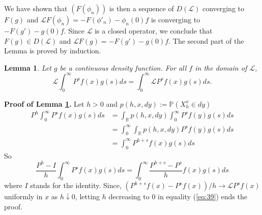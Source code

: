 \documentclass[a4paper, 11pt]{article}
\newtheorem{lem}{Lemma}
\renewcommand{\P}{\mathbb{P}}
\newcommand{\R}{\mathbb{R}}
\newcommand{\1}{\mathbf{1}}
\begin{document}
\noindent We have shown that $(F(\phi_n))$ is then a sequence of $D(\mathcal{L})$ converging to $F(g)$ and $\mathcal{L}F(\phi_n)=-F(\phi'_n)-\phi_n(0)f$ is converging to $-F(g')-g(0)f$. Since $\mathcal{L}$ is a closed operator, we conclude that $F(g)\in D(\mathcal{L})$ and $\mathcal{L}F(g)=-F(g')-g(0)f$.
The second part of the Lemma is proved by induction. \hfill \framebox[0.6em]

\begin{lem}\label{intervertion}
Let $g$ be a continuous density function. For all $f$ in the domain of $\mathcal{L}$,
$$\mathcal{L}\int_0^\infty P^sf(x)g(s)ds=\int_0^\infty \mathcal{L}P^sf(x)g(s)ds.$$
\end{lem}

\noindent\textbf{Proof of Lemma \ref{intervertion}.}
Let $h>0$ and $p(h,x,dy):=\P(X_h^x \in dy)$
\begin{align*}
P^h\int_0^\infty P^sf(x)g(s)ds&=\int_\R p(h,x,dy)\int_0^\infty P^sf(y)g(s)ds\\
&=\int_0^\infty \int_\R p(h,x,dy) P^sf(y)g(s)ds\\
&=\int_0^\infty P^{h+s}f(x)g(s)ds
\end{align*}
So
\begin{equation}
\label{eq:39}
\frac{P^h-I}{h}\int_0^\infty P^sf(x)g(s)ds=\int_0^\infty \frac{P^{h+s}-P^s}{h}f(x)g(s)ds
\end{equation}
where $I$ stands for the identity.
Since, $(P^{h+s}f(x)-P^sf(x))/h\rightarrow \mathcal{L}P^sf(x)$ uniformly in $x$ as $h\downarrow 0$, letting $h$ decreasing to $0$ in equality (\ref{eq:39}) ends the proof.

\hfill \framebox[0.6em]





\nocite{*}
\newpage
\renewcommand{\refname}{Bibliography}


\end{document}
